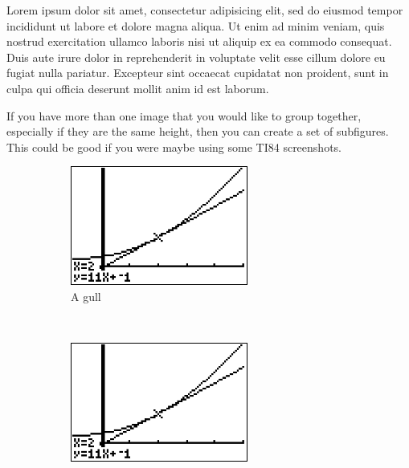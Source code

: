 \documentclass[a4paper,12pt]{article}
\begin{document}
Lorem ipsum dolor sit amet, consectetur adipisicing elit, sed do eiusmod tempor incididunt ut labore et dolore magna aliqua. Ut enim ad minim veniam, quis nostrud exercitation ullamco laboris nisi ut aliquip ex ea commodo consequat. Duis aute irure dolor in reprehenderit in voluptate velit esse cillum dolore eu fugiat nulla pariatur. Excepteur sint occaecat cupidatat non proident, sunt in culpa qui officia deserunt mollit anim id est laborum.\cite{mathworld:completethesquare}

If you have more than one image that you would like to group together, especially if they are the same height, then you can create a set of subfigures.  This could be good if you were maybe using some TI84 screenshots.

\begin{figure}
    \centering
    \begin{subfigure}[b]{0.3\textwidth}
        \includegraphics[width=\textwidth]{./0-images/20170509-123642.png}
        \caption{A gull}
        \label{fig:gull}
    \end{subfigure}
    ~ %
    \begin{subfigure}[b]{0.3\textwidth}
        \includegraphics[width=\textwidth]{./0-images/20170509-123642.png}

\end{subfigure}
\end{figure}
\end{document}
